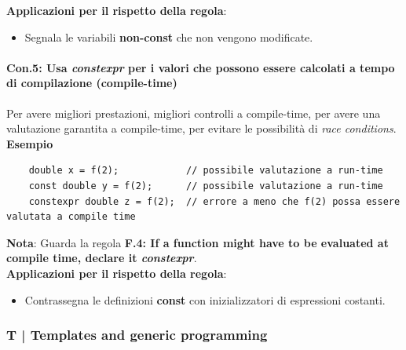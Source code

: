 \textsf{\small \textbf{Applicazioni per il rispetto della regola}: }

\begin{itemize}
	\item \textsf{\small Segnala le variabili \textbf{non-const} che non vengono modificate.}
\end{itemize}

\paragraph{Con.5: Usa \emph{constexpr} per i valori che possono essere calcolati a tempo di compilazione (compile-time)}

\textsf{\small Per avere migliori prestazioni, migliori controlli a compile-time, per avere una valutazione garantita a compile-time, per evitare le possibilità di \emph{race conditions}.} \\

\textsf{\small \textbf{Esempio}}

\begin{lstlisting}
	double x = f(2);            // possibile valutazione a run-time
	const double y = f(2);      // possibile valutazione a run-time
	constexpr double z = f(2);  // errore a meno che f(2) possa essere valutata a compile time
\end{lstlisting}

\textsf{\small \textbf{Nota}: Guarda la regola \textbf{F.4: If a function might have to be evaluated at compile time, declare it \emph{constexpr}}.} \\

\textsf{\small \textbf{Applicazioni per il rispetto della regola}: }

\begin{itemize}
	\item \textsf{\small Contrassegna le definizioni \textbf{const} con inizializzatori di espressioni costanti.} %
\end{itemize}

\break


\subsubsection{T | Templates and generic programming}

